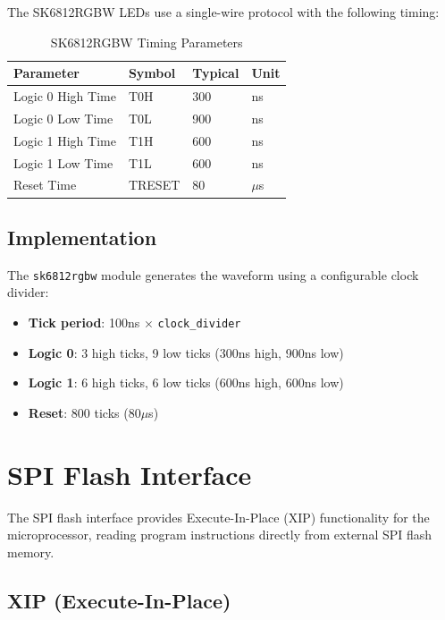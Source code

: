 \documentclass[11pt,a4paper]{article}
\begin{document}
The SK6812RGBW LEDs use a single-wire protocol with the following timing:

\begin{table}[H]
\centering
\caption{SK6812RGBW Timing Parameters}
\begin{tabular}{@{}llll@{}}
\toprule
\textbf{Parameter} & \textbf{Symbol} & \textbf{Typical} & \textbf{Unit} \\
\midrule
Logic 0 High Time & T0H & 300 & ns \\
Logic 0 Low Time & T0L & 900 & ns \\
Logic 1 High Time & T1H & 600 & ns \\
Logic 1 Low Time & T1L & 600 & ns \\
Reset Time & TRESET & 80 & $\mu$s \\
\bottomrule
\end{tabular}
\end{table}

\subsection{Implementation}

The \texttt{sk6812rgbw} module generates the waveform using a configurable clock divider:

\begin{itemize}[noitemsep]
    \item \textbf{Tick period}: 100ns $\times$ \texttt{clock\_divider}
    \item \textbf{Logic 0}: 3 high ticks, 9 low ticks (300ns high, 900ns low)
    \item \textbf{Logic 1}: 6 high ticks, 6 low ticks (600ns high, 600ns low)
    \item \textbf{Reset}: 800 ticks (80$\mu$s)
\end{itemize}

\section{SPI Flash Interface}

The SPI flash interface provides Execute-In-Place (XIP) functionality for the microprocessor, reading program instructions directly from external SPI flash memory.

\subsection{XIP (Execute-In-Place)}
\end{document}
